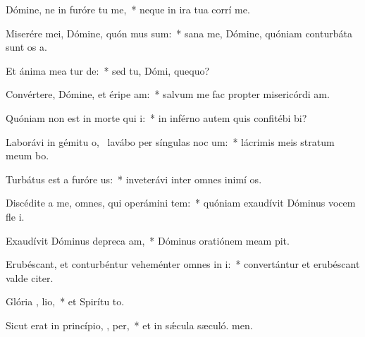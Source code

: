 \item Dómine, ne in furóre tu  me,~* neque in ira tua corrí me.
\item Miserére mei, Dómine, quón mus sum:~* sana me, Dómine, quóniam conturbáta sunt os a.
\item Et ánima mea tur  de:~* sed tu, Dómi, quequo?
\item Convértere, Dómine, et éripe  am:~* salvum me fac propter misericórdi am.
\item Quóniam non est in morte qui   i:~* in inférno autem quis confitébi bi?
\item Laborávi in gémitu o,~\pscross{} lavábo per síngulas noc  um:~* lácrimis meis stratum meum bo.
\item Turbátus est a furóre  us:~* inveterávi inter omnes inimí os.
\item Discédite a me, omnes, qui operámini tem:~* quóniam exaudívit Dóminus vocem fle i.
\item Exaudívit Dóminus depreca am,~* Dóminus oratiónem meam pit.
\item Erubéscant, et conturbéntur veheménter omnes in i:~* convertántur et erubéscant valde citer.
\item Glória ,  lio,~* et Spirítu to.
\item Sicut erat in princípio,  ,  per,~* et in sǽcula sæculó. men.
